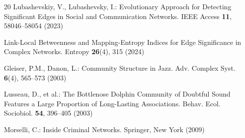 \documentclass[runningheads,11pt]{article}
\begin{document}
\begin{thebibliography}{20}
Lubashevskiy, V., Lubashevsky, I.: Evolutionary Approach for Detecting
Significant Edges in Social and Communication Networks. IEEE Access \textbf{11},
58046--58054 (2023)

Link-Local Betweenness and Mapping-Entropy Indices for Edge Significance in
Complex Networks. Entropy \textbf{26}(4), 315 (2024)

Gleiser, P.M., Danon, L.: Community Structure in Jazz. Adv. Complex Syst.
\textbf{6}(4), 565--573 (2003)

Lusseau, D., et al.: The Bottlenose Dolphin Community of Doubtful Sound Features
a Large Proportion of Long-Lasting Associations. Behav. Ecol. Sociobiol.
\textbf{54}, 396--405 (2003)

Morselli, C.: Inside Criminal Networks. Springer, New York (2009)

\end{thebibliography}
\end{document}
